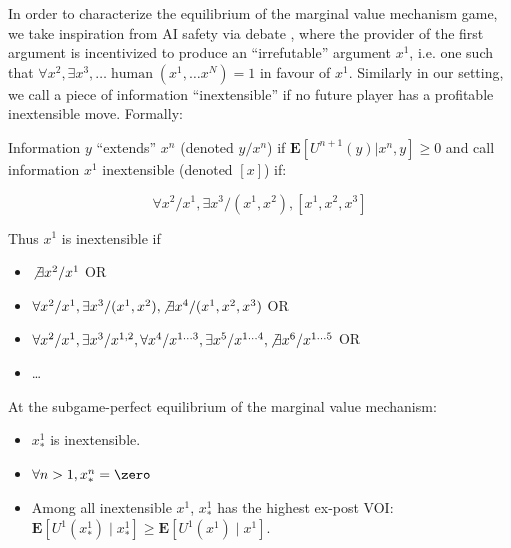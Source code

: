 In order to characterize the equilibrium of the marginal value mechanism game, we take inspiration from AI safety via debate , where the provider of the first argument is incentivized to produce an ``irrefutable'' argument $x^1$, i.e. one such that $\forall x^2,\exists x^3, \dots\operatorname{human}(x^1,\dots x^N)=1$ in favour of $x^1$. Similarly in our setting, we call a piece of information ``inextensible'' if no future player has a profitable inextensible move. Formally:

\begin{definition}[Inextensibility]
Information $y$ ``extends'' $x^n$ (denoted $y/x^n$) if $\mathbf{E}[U^{n+1}(y)|x^n,y]\ge 0$ and call information $x^1$ inextensible (denoted $[x]$) if:

$$\forall x^2/x^1, \exists x^3/(x^1,x^2), [x^1,x^2,x^3]$$
\end{definition}

Thus $x^1$ is inextensible if

\begin{itemize}
\item $\not\exists x^2/x^1$ OR
\item $\forall x^2/x^1,\exists x^3/(x^1,x^2),\not\exists x^4/(x^1,x^2,x^3)$ OR
\item $\forall x^2/x^1,\exists x^3/x^{1,2},\forall x^4/x^{1\dots 3},\exists x^5/x^{1\dots 4},\not\exists x^6/x^{1\dots 5}$ OR
\item \dots
\end{itemize}

\begin{theorem}
At the subgame-perfect equilibrium of the marginal value mechanism:
\begin{itemize}
\item $x^1_*$ is inextensible.
\item $\forall n>1,x^n_*=\zero$
\item Among all inextensible $x^1$, $x^1_*$ has the highest ex-post VOI: $\mathbf{E}[U^1(x^1_*)\mid x^1_*]\ge\mathbf{E}[U^1(x^1)\mid x^1]$.
\end{itemize}
\label{infonomy:thm:eq}
\end{theorem}

